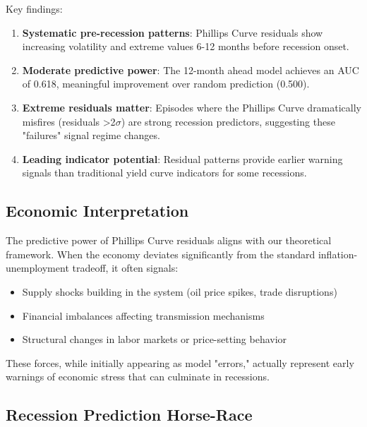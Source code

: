 \documentclass[12pt]{article}
\begin{document}
Key findings:

\begin{enumerate}
    \item \textbf{Systematic pre-recession patterns}: Phillips Curve residuals show increasing volatility and extreme values 6-12 months before recession onset.
    
    \item \textbf{Moderate predictive power}: The 12-month ahead model achieves an AUC of 0.618, meaningful improvement over random prediction (0.500).
    
    \item \textbf{Extreme residuals matter}: Episodes where the Phillips Curve dramatically misfires (residuals >2$\sigma$) are strong recession predictors, suggesting these "failures" signal regime changes.
    
    \item \textbf{Leading indicator potential}: Residual patterns provide earlier warning signals than traditional yield curve indicators for some recessions.
\end{enumerate}

\subsection{Economic Interpretation}

The predictive power of Phillips Curve residuals aligns with our theoretical framework. When the economy deviates significantly from the standard inflation-unemployment tradeoff, it often signals:

\begin{itemize}
    \item Supply shocks building in the system (oil price spikes, trade disruptions)
    \item Financial imbalances affecting transmission mechanisms
    \item Structural changes in labor markets or price-setting behavior
\end{itemize}

These forces, while initially appearing as model "errors," actually represent early warnings of economic stress that can culminate in recessions.

\subsection{Recession Prediction Horse-Race}
\end{document}
